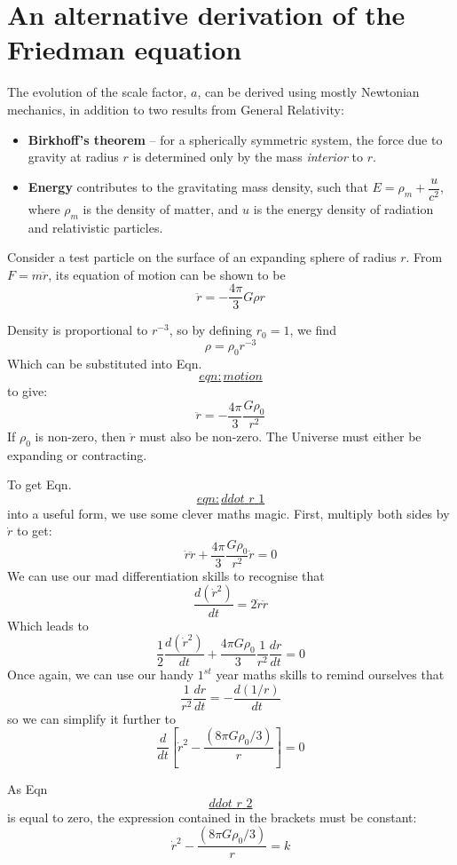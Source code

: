 \documentclass[]{book}
\begin{document}
\section{An alternative derivation of the Friedman
equation}\label{sec:alt_friedman}

The evolution of the scale factor, \(a\), can be derived using mostly
Newtonian mechanics, in addition to two results from General Relativity:

\begin{itemize}
\item
  \textbf{Birkhoff's theorem} -- for a spherically symmetric system, the
  force due to gravity at radius \(r\) is determined only by the mass
  \emph{interior} to \(r\).
\item
  \textbf{Energy} contributes to the gravitating mass density, such that
  \(E = \rho_m + \dfrac{u}{c^2}\), where \(\rho_m\) is the density of
  matter, and \(u\) is the energy density of radiation and relativistic
  particles.
\end{itemize}

Consider a test particle on the surface of an expanding sphere of radius
\(r\). From \(F= m \ddot{r}\), its equation of motion can be shown to be
\[\label{eqn:motion}
    \ddot{r} = -\dfrac{4\pi}{3} G \rho r\]

Density is proportional to \(r^{-3}\), so by defining \(r_{0} = 1\), we
find \[\rho = \rho_{0}r^{-3}\] Which can be substituted into
Eqn.~\protect\hyperlink{eqn:motion}{\[eqn:motion\]} to give:
\[\label{eqn:ddot_r_1}
    \ddot{r} = -\dfrac{4\pi}{3}\dfrac{G\rho_0}{r^2}\] If \(\rho_0\) is
non-zero, then \(\ddot{r}\) must also be non-zero. The Universe must
either be expanding or contracting.

To get Eqn.~\protect\hyperlink{eqn:ddot_r_1}{\[eqn:ddot\_r\_1\]} into a
useful form, we use some clever maths magic. First, multiply both sides
by \(\dot{r}\) to get:
\[\dot{r}\ddot{r} + \dfrac{4\pi}{3}\dfrac{G\rho_{0}}{r^2}\dot{r} = 0\]
We can use our mad differentiation skills to recognise that
\[\dfrac{d(\dot{r}^2)}{dt} = 2\dot{r}\ddot{r}\] Which leads to
\[\dfrac{1}{2}\dfrac{d(\dot{r}^2)}{dt} + \dfrac{4\pi G \rho_0}{3} \dfrac{1}{r^2}\dfrac{dr}{dt} = 0\]
Once again, we can use our handy \(1^{st}\) year maths skills to remind
ourselves that \[\dfrac{1}{r^2}\dfrac{dr}{dt} = -\dfrac{d(1/r)}{dt}\] so
we can simplify it further to \[\label{ddot_r_2}
    \dfrac{d}{dt}\left[\dot{r}^2 - \dfrac{(8\pi G \rho_0 / 3)}{r}\right] = 0\]

As Eqn~\protect\hyperlink{ddot_r_2}{\[ddot\_r\_2\]} is equal to zero,
the expression contained in the brackets must be constant:
\[\dot{r}^2 - \dfrac{(8\pi G \rho_0 / 3)}{r} = k\]
\end{document}
